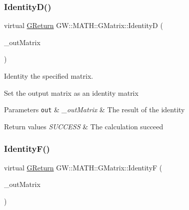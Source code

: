 \subsubsection{\texorpdfstring{Identity\+D()}{IdentityD()}}
{\footnotesize\ttfamily virtual \mbox{\hyperlink{namespace_g_w_a67a839e3df7ea8a5c5686613a7a3de21}{G\+Return}} G\+W\+::\+M\+A\+T\+H\+::\+G\+Matrix\+::\+IdentityD (\begin{DoxyParamCaption}\item[{\mbox{\hyperlink{struct_g_w_1_1_m_a_t_h_1_1_g_m_a_t_r_i_x_d}{G\+M\+A\+T\+R\+I\+XD}} \&}]{\+\_\+out\+Matrix }\end{DoxyParamCaption})\hspace{0.3cm}{\ttfamily [pure virtual]}}



Identity the specified matrix. 

Set the output matrix as an identity matrix


\begin{DoxyParams}[1]{Parameters}
\mbox{\tt out}  & {\em \+\_\+out\+Matrix} & The result of the identity\\
\hline
\end{DoxyParams}

\begin{DoxyRetVals}{Return values}
{\em S\+U\+C\+C\+E\+SS} & The calculation succeed \\
\hline
\end{DoxyRetVals}
\mbox{\label{class_g_w_1_1_m_a_t_h_1_1_g_matrix_aee68de35de388c5893b6fcdd450dd1d3}} 
\subsubsection{\texorpdfstring{Identity\+F()}{IdentityF()}}
{\footnotesize\ttfamily virtual \mbox{\hyperlink{namespace_g_w_a67a839e3df7ea8a5c5686613a7a3de21}{G\+Return}} G\+W\+::\+M\+A\+T\+H\+::\+G\+Matrix\+::\+IdentityF (\begin{DoxyParamCaption}\item[{\mbox{\hyperlink{struct_g_w_1_1_m_a_t_h_1_1_g_m_a_t_r_i_x_f}{G\+M\+A\+T\+R\+I\+XF}} \&}]{\+\_\+out\+Matrix }\end{DoxyParamCaption})\hspace{0.3cm}{\ttfamily [pure virtual]}}



